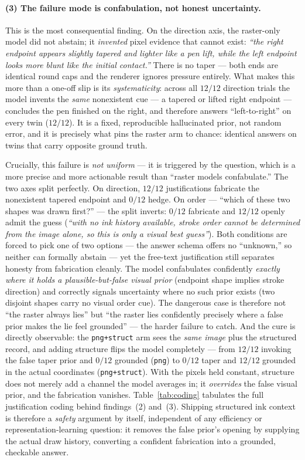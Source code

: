 \documentclass[11pt]{article}
\newcommand{\code}[1]{\texttt{#1}}
\begin{document}
\paragraph{(3) The failure mode is confabulation, not honest uncertainty.} This
is the most consequential finding. On the direction axis, the raster-only model
did not abstain; it \emph{invented} pixel evidence that cannot exist:
\emph{``the right endpoint appears slightly tapered and lighter like a pen lift,
while the left endpoint looks more blunt like the initial contact.''} There is no
taper --- both ends are identical round caps and the renderer ignores pressure
entirely. What makes this more than a one-off slip is its \emph{systematicity}:
across all $12/12$ direction trials the model invents the \emph{same} nonexistent
cue --- a tapered or lifted right endpoint --- concludes the pen finished on the
right, and therefore answers ``left-to-right'' on every twin ($12/12$). It is a
fixed, reproducible hallucinated prior, not random error, and it is precisely
what pins the raster arm to chance: identical answers on twins that carry
opposite ground truth.

Crucially, this failure is \emph{not uniform} --- it is triggered by the question,
which is a more precise and more actionable result than ``raster models
confabulate.'' The two axes split perfectly. On direction, $12/12$ justifications
fabricate the nonexistent tapered endpoint and $0/12$ hedge. On order --- ``which
of these two shapes was drawn first?'' --- the split inverts: $0/12$ fabricate and
$12/12$ openly admit the guess (\emph{``with no ink history available, stroke
order cannot be determined from the image alone, so this is only a visual best
guess''}). Both conditions are forced to pick one of two options --- the answer
schema offers no ``unknown,'' so neither can formally abstain --- yet the
free-text justification still separates honesty from fabrication cleanly. The
model confabulates confidently \emph{exactly where it holds a plausible-but-false
visual prior} (endpoint shape implies stroke direction) and correctly signals
uncertainty where no such prior exists (two disjoint shapes carry no visual order
cue). The dangerous case is therefore not ``the raster always lies'' but ``the
raster lies confidently precisely where a false prior makes the lie feel
grounded'' --- the harder failure to catch. And the cure is directly observable:
the \code{png+struct} arm sees the \emph{same image} plus the structured record,
and adding structure flips the model completely --- from $12/12$ invoking the
false taper prior and $0/12$ grounded (\code{png}) to $0/12$ taper and $12/12$
grounded in the actual coordinates (\code{png+struct}). With the pixels held
constant, structure does not merely add a channel the model averages in; it
\emph{overrides} the false visual prior, and the fabrication vanishes.
Table~\ref{tab:coding} tabulates the full justification coding behind findings~(2)
and~(3). Shipping structured ink context is therefore a \emph{safety} argument by
itself, independent of any efficiency or representation-learning question: it
removes the false prior's opening by supplying the actual draw history, converting
a confident fabrication into a grounded, checkable answer.
\end{document}
